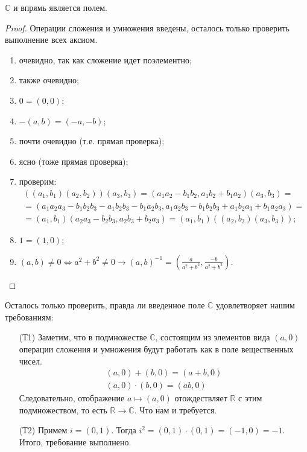 \begin{Suggestion}
$\mathbb{C}$ и впрямь является полем.
\end{Suggestion}

\begin{proof}
Операции сложения и умножения введены, осталось только проверить выполнение всех аксиом.
\begin{enumerate}
\item очевидно, так как сложение идет поэлементно;
\item также очевидно;
\item $0 = (0, 0)$;
\item $-(a, b) = (-a, -b)$;
\item почти очевидно (т.е. прямая проверка);
\item ясно (тоже прямая проверка);
\item проверим:
\begin{gather*}
((a_1, b_1) (a_2, b_2)) (a_3, b_3) = (a_1a_2 - b_1b_2, a_1b_2 + b_1a_2) (a_3, b_3) = \\ 
= (a_1a_2a_3 - b_1b_2b_3 - a_1b_2b_3 - b_1a_2b_3, a_1a_2b_3 - b_1b_2b_3 + a_1b_2a_3 + b_1a_2a_3) = \\
= (a_1, b_1)  (a_2a_3 - b_2b_3, a_2b_3 + b_2a_3) = (a_1, b_1)((a_2, b_2) (a_3, b_3));
\end{gather*}
\item $1 = (1, 0)$;
\item $(a, b) \neq 0 \Leftrightarrow a^2 + b^2 \neq 0 \rightarrow (a, b)^{-1} = \left(\frac{a}{a^2 + b^2}, \frac{-b}{a^2 + b^2}\right)$.
\end{enumerate}
\end{proof}

Осталось только проверить, правда ли введенное поле $\mathbb{C}$ удовлетворяет нашим требованиям:
\begin{itemize}
\item[(Т1)] Заметим, что в подмножестве $\mathbb{C}$, состоящим из элементов вида $(a, 0)$ операции сложения и умножения будут работать как в поле вещественных чисел.
\begin{gather*}
(a, 0) + (b, 0) = (a + b, 0) \\
(a, 0) \cdot (b, 0) = (ab, 0)
\end{gather*} 
Следовательно, отображение $a \mapsto (a, 0)$ отождествляет $\mathbb{R}$ с этим подмножеством, то есть $\mathbb{R} \rightarrow \mathbb{C}$. Что нам и требуется.
\item[(Т2)] Примем $i = (0, 1)$. Тогда $i^2 = (0, 1) \cdot (0, 1) = (-1, 0) = -1$. Итого, требование выполнено.
\end{itemize}

